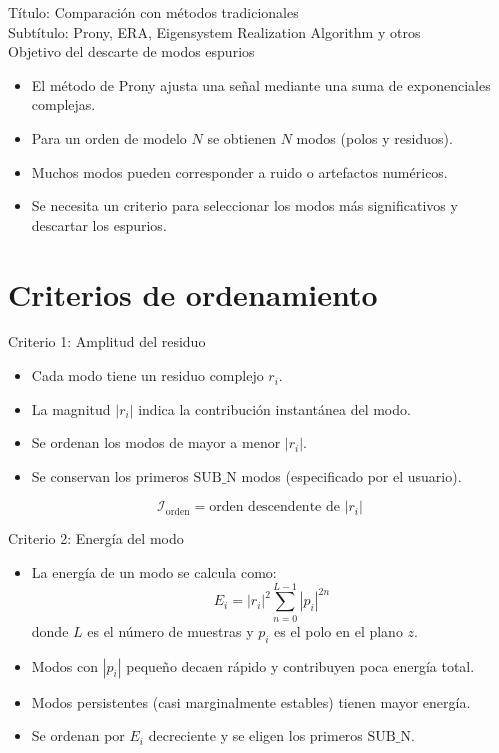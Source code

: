 Título: Comparación con métodos tradicionales\\
Subtítulo: Prony, ERA, Eigensystem Realization Algorithm y otros\\

{Objetivo del descarte de modos espurios}
\begin{itemize}
  \item El método de Prony ajusta una señal mediante una suma de exponenciales complejas.
  \item Para un orden de modelo \(N\) se obtienen \(N\) modos (polos y residuos).
  \item Muchos modos pueden corresponder a ruido o artefactos numéricos.
  \item Se necesita un criterio para seleccionar los modos más significativos y descartar los espurios.
\end{itemize}

\section{Criterios de ordenamiento}

{Criterio 1: Amplitud del residuo}
\begin{itemize}
  \item Cada modo tiene un residuo complejo \(r_i\).
  \item La magnitud \(|r_i|\) indica la contribución instantánea del modo.
  \item Se ordenan los modos de mayor a menor \(|r_i|\).
  \item Se conservan los primeros \(\text{SUB\_N}\) modos (especificado por el usuario).
\end{itemize}
\[
\mathcal{I}_{\text{orden}} = \text{orden descendente de } |r_i|
\]

{Criterio 2: Energía del modo}
\begin{itemize}
  \item La energía de un modo se calcula como:
  \[
  E_i = |r_i|^2 \sum_{n=0}^{L-1} |p_i|^{2n}
  \]
  donde \(L\) es el número de muestras y \(p_i\) es el polo en el plano \(z\).
  \item Modos con \(|p_i|\) pequeño decaen rápido y contribuyen poca energía total.
  \item Modos persistentes (casi marginalmente estables) tienen mayor energía.
  \item Se ordenan por \(E_i\) decreciente y se eligen los primeros \(\text{SUB\_N}\).
\end{itemize}

